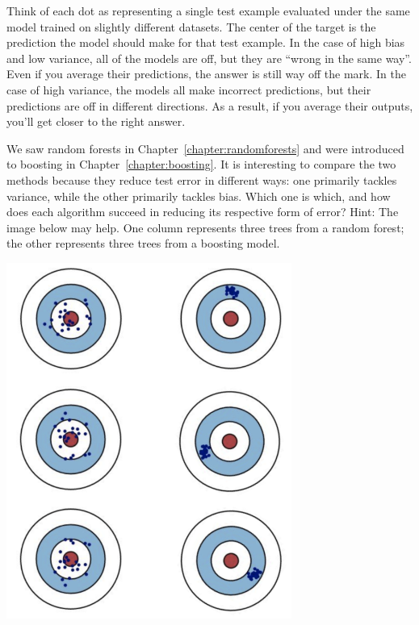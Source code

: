 Think of each dot as representing a single test example evaluated under the same model trained on slightly different datasets. The center of the target is the prediction the model should make for that test example. In the case of high bias and low variance, all of the models are off, but they are ``wrong in the same way''. Even if you average their predictions, the answer is still way off the mark. In the case of high variance, the models all make incorrect predictions, but their predictions are off in different directions. As a result, if you average their outputs, you'll get closer to the right answer. 

\vspace{2mm}

\begin{question}{}
We saw random forests in Chapter~\ref{chapter:randomforests} and were introduced to boosting in Chapter~\ref{chapter:boosting}. It is interesting to compare the two methods because they reduce test error in different ways: one primarily tackles variance, while the other primarily tackles bias. Which one is which, and how does each algorithm succeed in reducing its respective form of error? Hint: The image below may help. One column represents three trees from a random forest; the other represents three trees from a boosting model.

\begin{center}
\includegraphics[width=0.7\textwidth]{img/bias-variance-reduction-targets.png}
\end{center}
\end{question}
